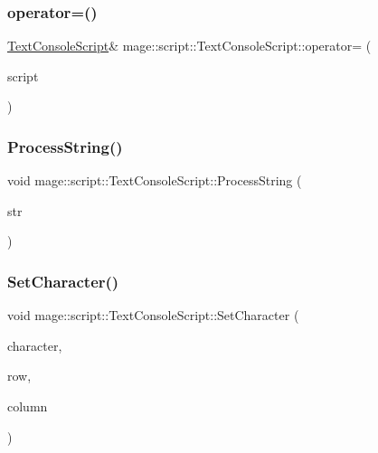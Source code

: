 \subsubsection{\texorpdfstring{operator=()}{operator=()}\hspace{0.1cm}{\footnotesize\ttfamily [2/2]}}
{\footnotesize\ttfamily \hyperlink{classmage_1_1script_1_1_text_console_script}{Text\+Console\+Script}\& mage\+::script\+::\+Text\+Console\+Script\+::operator= (\begin{DoxyParamCaption}\item[{\hyperlink{classmage_1_1script_1_1_text_console_script}{Text\+Console\+Script} \&\&}]{script }\end{DoxyParamCaption})\hspace{0.3cm}{\ttfamily [delete]}}

\hypertarget{classmage_1_1script_1_1_text_console_script_a9c990e0256f01eb4cc1622bf346f32a5}{}\label{classmage_1_1script_1_1_text_console_script_a9c990e0256f01eb4cc1622bf346f32a5} 
\subsubsection{\texorpdfstring{Process\+String()}{ProcessString()}}
{\footnotesize\ttfamily void mage\+::script\+::\+Text\+Console\+Script\+::\+Process\+String (\begin{DoxyParamCaption}\item[{\hyperlink{namespacemage_a8769f9d670d6b585ea306cb1062af94b}{Not\+Null}$<$ \hyperlink{namespacemage_ac409e0f2a22292a3a4cd42742994fbf0}{const\+\_\+wzstring} $>$}]{str }\end{DoxyParamCaption})\hspace{0.3cm}{\ttfamily [private]}}

\hypertarget{classmage_1_1script_1_1_text_console_script_a18bdee79ee6f53e28f90b607c36c8188}{}\label{classmage_1_1script_1_1_text_console_script_a18bdee79ee6f53e28f90b607c36c8188} 
\subsubsection{\texorpdfstring{Set\+Character()}{SetCharacter()}}
{\footnotesize\ttfamily void mage\+::script\+::\+Text\+Console\+Script\+::\+Set\+Character (\begin{DoxyParamCaption}\item[{wchar\+\_\+t}]{character,  }\item[{\hyperlink{namespacemage_a41c104c036fba3756a74e19f793eeaa1}{U32}}]{row,  }\item[{\hyperlink{namespacemage_a41c104c036fba3756a74e19f793eeaa1}{U32}}]{column }\end{DoxyParamCaption})\hspace{0.3cm}{\ttfamily [private]}}

